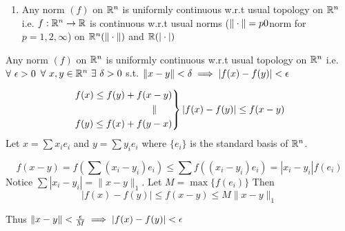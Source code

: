 {\begin{enumerate}
\begin{itemize}
			            Matrix of $T=\begin{bmatrix}
					            a_{11} & a_{12} & \cdots & a_{1n} \\
					            a_{21} & a_{22} & \cdots & a_{2n} \\
					            \vdots & \vdots & \ddots & \vdots \\
					            a_{m1} & a_{m2} & \cdots & a_{mn}
				            \end{bmatrix}$
			      \item  $\underset{A}{M_{n\times n}(\bbR)}\underset{\longmapsto}{\to} \underset{det(A)}{\bbR}$ is continuous

			            $\frac1{\text{det}}:GL_n(\bbR)\to\bbR$ \parinn

			            Here $M_{n\times n}$ is a vector space of dimension $n^2$ in which $GL_n(\bbR)=\{A\mid \det(A)\neq 0\}$ is an open set.

			      \item $\underset{A\longmapsto A^{-1}}{ GL_n(\bbR) \to GL_n(\bbR) }$ is continuous.

		      \end{itemize}
		\item Any norm $(f)$ on $\mathbb{R}^n$ is uniformly continuous w.r.t usual topology on $\mathbb{R}^n$ i.e. $f:\mathbb{R}^n\to\mathbb{R}$ is continuous w.r.t usual norms ($\|\cdot\|=p0$norm for $p=1,2,\infty$) on $\mathbb{R}^n(\|\cdot\|)$ and $\mathbb{R}(|\cdot|)$
	\end{enumerate}
}
\begin{Theorem}{}{}
	Any norm $(f)$ on $\mathbb{R}^n$ is uniformly continuous w.r.t usual topology on $\mathbb{R}^n$ i.e. $\forall\ \epsilon>0$ $\forall\ x,y\in\mathbb{R}^n\ \exists\ \delta>0$ s.t. $\|x-y\|<\delta\implies |f(x)-f(y)|<\epsilon$
\end{Theorem}
\begin{myproof}
	$$\begin{rcases*}
			f(x)\leq f(y)+f(x-y) \\ \qquad \qquad\qquad \qquad \parallel\\ f(y)\leq f(x)+f(y-x)
		\end{rcases*}|f(x)-f(y)|\leq f(x-y)$$Let $x=\sum x_ie_i$ and $y=\sum y_ie_i$ where $\{e_i\}$ is the standard basis of $\mathbb{R}^n$.

	$$f(x-y)=f\left(\sum (x_i-y_i)e_i\right)\leq \sum f\left((x_i-y_i)e_i\right)=|x_i-y_i|f(e_i)$$ Notice $\sum|x_i-y_i|=\|x-y\|_1$. Let $M=\max\{f(e_i)\}$ Then $$|f(x)-f(y)|\leq f(x-y)\leq M\|x-y\|_1$$

	Thus $\|x-y\|<\frac{\epsilon}{M}\implies |f(x)-f(y)|<\epsilon$
\end{myproof}
